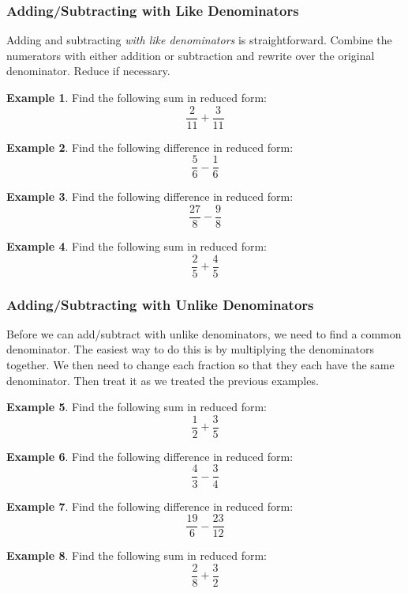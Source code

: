 \documentclass[addpoints,12pt]{exam}
\theoremstyle{definition}
\newtheorem{example}{Example}[subsection]
\begin{document}
\subsubsection*{Adding/Subtracting with Like Denominators}
Adding and subtracting \emph{with like denominators} is straightforward. Combine the numerators with either addition or subtraction and rewrite over the original denominator. Reduce if necessary.

\begin{example}
Find the following sum in reduced form: \[\dfrac{2}{11}+\dfrac{3}{11}\]
\vspace{.75in}
\end{example}
\begin{example}
Find the following difference in reduced form: \[\dfrac{5}{6}- \dfrac{1}{6}\]
\vspace{.75in}
\end{example}
\begin{example}
Find the following difference in reduced form: \[\dfrac{27}{8}-\dfrac{9}{8}\]
\vspace{.75in}
\end{example}
\begin{example}
Find the following sum in reduced form: \[\dfrac{2}{5} +\dfrac{4}{5}\]
\vspace{.75in}
\end{example}

\subsubsection*{Adding/Subtracting with Unlike Denominators}
Before we can add/subtract with unlike denominators, we need to find a common denominator. The easiest way to do this is by multiplying the denominators together. We then need to change each fraction so that they each have the same denominator. Then treat it as we treated the previous examples.

\begin{example}
Find the following sum in reduced form: \[\dfrac{1}{2}+\dfrac{3}{5}\]
\vspace{.75in}
\end{example}
\begin{example}
Find the following difference in reduced form: \[\dfrac{4}{3}- \dfrac{3}{4}\]
\vspace{.75in}
\end{example}
\begin{example}
Find the following difference in reduced form: \[\dfrac{19}{6}-\dfrac{23}{12}\]
\vspace{.75in}
\end{example}
\begin{example}
Find the following sum in reduced form: \[\dfrac{2}{8} +\dfrac{3}{2}\]
\vspace{.75in}
\end{example}
\end{document}
